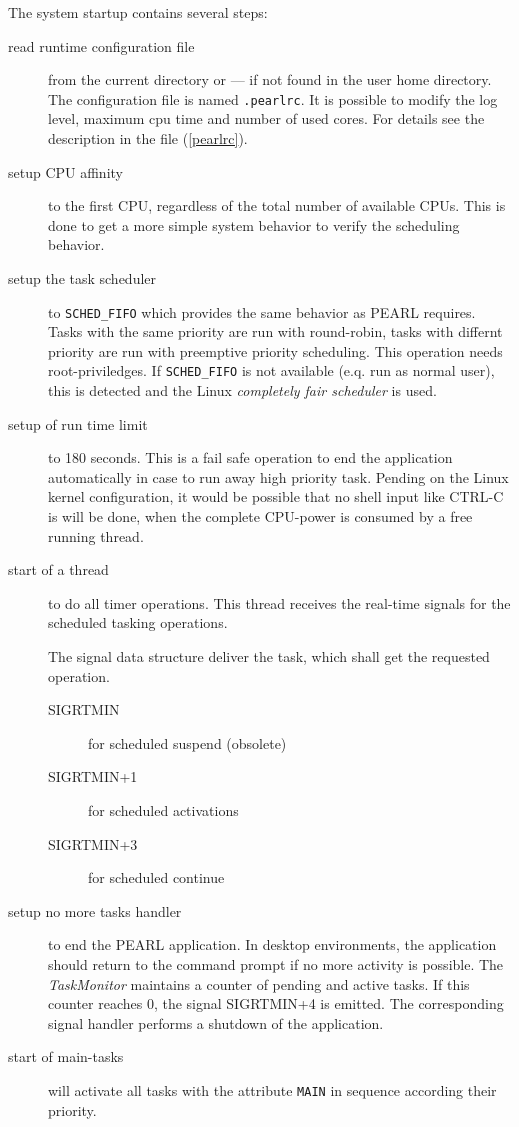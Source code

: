 The system startup contains several steps:
\begin{description}
\item[read runtime configuration file] from the current directory or ---
   if not found in the user home directory.
   The configuration file is named \texttt{.pearlrc}.
   It is possible to modify the log level, maximum cpu time and number of 
   used cores. 
   For details see the description in the file (\ref{pearlrc}).
\item[setup CPU affinity] to the first CPU, regardless of the
   total number of available CPUs. This is done to get a more simple
   system behavior to verify the scheduling behavior.
\item[setup the task scheduler] to \verb|SCHED_FIFO| which provides
   the same behavior as PEARL requires. Tasks with the same priority
   are run with round-robin, tasks with differnt priority are run with
   preemptive priority scheduling.
   This operation needs root-priviledges. If \verb|SCHED_FIFO|
   is not available (e.q. run as normal user), this is detected and the 
   Linux {\em completely fair scheduler} is used.
\item[setup of run time limit] to 180 seconds. This is a fail safe
   operation to end the application automatically in case to run away
   high priority task. Pending on the Linux kernel configuration,
   it would be possible that no shell input like CTRL-C is will
   be done, when the complete CPU-power is consumed by a free running thread.
\item[start of a thread] to do all timer operations. This thread 
   receives the real-time signals for the scheduled tasking operations.

   The signal data
   structure deliver the task, which shall get the requested operation.
   \begin{description}
    \item[SIGRTMIN] for scheduled suspend (obsolete)
    \item[SIGRTMIN+1] for scheduled activations
    \item[SIGRTMIN+3] for scheduled continue
    \end{description}
\item[setup no more tasks handler] to end the PEARL application.
   In desktop environments, the application should return to the 
   command prompt if no more activity is possible.
   The {\em TaskMonitor} maintains a counter of pending and active 
   tasks. If this counter reaches $0$, the signal SIGRTMIN+4 is emitted.
   The corresponding signal handler performs a shutdown of the application.
\item[start of main-tasks] will activate all tasks with the attribute
     \verb|MAIN| in sequence according their priority.
\end{description}


